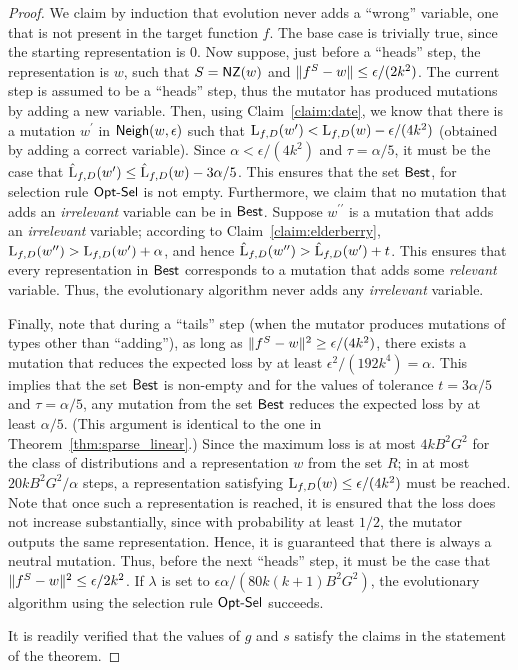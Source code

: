 \begin{proof}
We claim by induction that evolution never adds a ``wrong'' variable, \ie one
that is not present in the target function $f$. The base case is trivially true,
since the starting representation is $0$. Now suppose, just before a ``heads''
step, the representation is $w$, such that $S = \mathsf{NZ}(w)$ and $\Vert f^S - w \Vert
\leq \epsilon/(2k^2)$. The current step is assumed to be a ``heads'' step, thus
the mutator has produced mutations by adding a new variable. Then, using
Claim~\ref{claim:date}, we know that there is a mutation $w^\prime$ in
$\mathsf{Neigh}(w, \epsilon)$ such that $\mathrm{L}_{f, D}(w^\prime) < \mathrm{L}_{f, D}(w) -
\epsilon/(4k^2)$ (obtained by adding a correct variable). Since $\alpha <
\epsilon/(4k^2)$ and $\tau = \alpha/5$, it must be the case that
$\hat{\mathrm{L}}_{f, D}(w^\prime) \leq \hat{\mathrm{L}}_{f, D}(w) - 3 \alpha/5$. This
ensures that the set $\mathsf{Best}$, for selection rule $\mathsf{Opt\mbox{-}Sel}$ is not empty.
Furthermore, we claim that no mutation that adds an \emph{irrelevant} variable
can be in $\mathsf{Best}$. Suppose $w^{\prime\prime}$ is a mutation that adds an
\emph{irrelevant} variable; according to Claim~\ref{claim:elderberry},
$\mathrm{L}_{f, D}(w^{\prime\prime})> \mathrm{L}_{f, D}(w^\prime) + \alpha$, and hence
$\hat{\mathrm{L}}_{f, D}(w^{\prime\prime}) > \hat{\mathrm{L}}_{f, D}(w^\prime) + t$. This ensures
that every representation in $\mathsf{Best}$ corresponds to a mutation that adds some
\emph{relevant} variable. Thus, the evolutionary algorithm never adds any
\emph{irrelevant} variable.

Finally, note that during a ``tails'' step (when the mutator produces mutations of types
other than ``adding''), as long as $\Vert f^S - w \Vert^2 \geq \epsilon/(4k^2)$,
there exists a mutation that reduces the expected loss by at least
$\epsilon^2/(192k^4) = \alpha$. This implies that the set $\mathsf{Best}$ is non-empty
and for the values of tolerance $t = 3\alpha/5$ and $\tau = \alpha/5$, any
mutation from the set $\mathsf{Best}$ reduces the expected loss by at least $\alpha/5$.
(This argument is identical to the one in Theorem~\ref{thm:sparse_linear}.)
Since the maximum loss is at most $4kB^2G^2$ for the class of distributions and
a representation $w$ from the set $R$; in at most $20kB^2G^2/\alpha$ steps, a
representation satisfying $\mathrm{L}_{f, D}(w) \leq \epsilon/(4k^2)$ must be
reached. Note that once such a representation is reached, it is ensured that the
loss does not increase substantially, since with probability at least $1/2$, the
mutator outputs the same representation. Hence, it is guaranteed that there is
always a neutral mutation. Thus, before the next ``heads'' step, it must be the
case that $\Vert f^S - w \Vert^2 \leq \epsilon/2k^2$. If $\lambda$ is set to
$\epsilon\alpha/(80 k(k+1)B^2G^2)$, the evolutionary algorithm using the
selection rule $\mathsf{Opt\mbox{-}Sel}$ succeeds. 

It is readily verified that the values of $g$ and $s$ satisfy the claims in the
statement of the theorem.
\end{proof}

